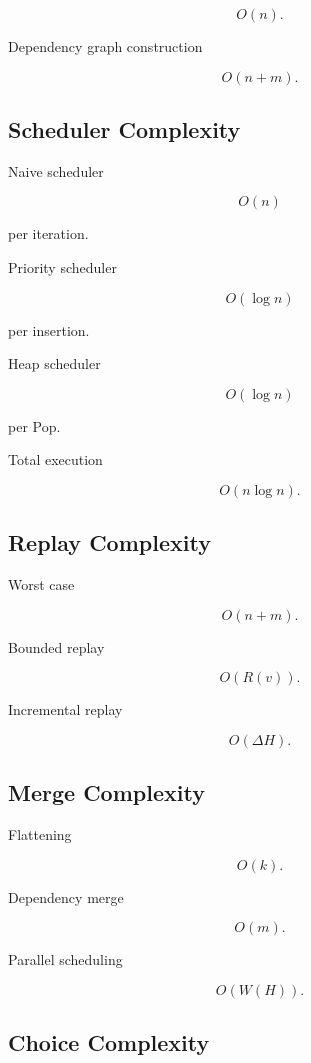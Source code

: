\documentclass[12pt,oneside]{article}
\theoremstyle{definition}
\theoremstyle{remark}
\begin{document}
\[
O(n).
\]

Dependency graph construction

\[
O(n+m).
\]

\subsection*{Scheduler Complexity}

Naive scheduler

\[
O(n)
\]

per iteration.

Priority scheduler

\[
O(\log n)
\]

per insertion.

Heap scheduler

\[
O(\log n)
\]

per Pop.

Total execution

\[
O(n\log n).
\]

\subsection*{Replay Complexity}

Worst case

\[
O(n+m).
\]

Bounded replay

\[
O(R(v)).
\]

Incremental replay

\[
O(\Delta H).
\]

\subsection*{Merge Complexity}

Flattening

\[
O(k).
\]

Dependency merge

\[
O(m).
\]

Parallel scheduling

\[
O(W(H)).
\]

\subsection*{Choice Complexity}
\end{document}
